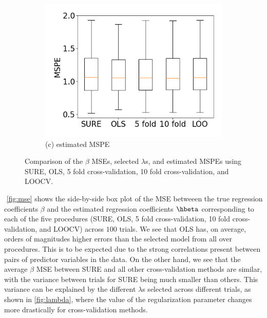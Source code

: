 \begin{figure}[t!]
\begin{subfigure}[b]{.32\columnwidth}
    \includegraphics[width=\columnwidth]{../fig/collinear_mspe.png}
    \caption{(c) estimated MSPE}
    \label{fig:mspe}
\end{subfigure}
\caption{Comparison of the $\beta$ MSEs, selected $\lambda$s, and estimated MSPEs using SURE, OLS, 5 fold cross-validation, 10 fold cross-validation, and LOOCV.}
\end{figure}

$ $\newline
\cref{fig:mse} shows the side-by-side box plot of the MSE betweeen the true regression coefficients $\beta$ and the estimated regression coefficients $\hbeta$ corresponding to each of the five procedures (SURE, OLS, 5 fold cross-validation, 10 fold cross-validation, and LOOCV) across $100$ trials. We see that OLS has, on average, orders of magnitudes higher errors than the selected model from all over procedures. This is to be expected due to the strong correlations present between pairs of predictor variables in the data. On the other hand, we see that the average $\beta$ MSE between SURE and all other cross-validation methods are similar, with the variance between trials for SURE being much smaller than others. This variance can be explained by the different $\lambda$s selected across different trials, as shown in \cref{fig:lambda}, where the value of the regularization parameter changes more drastically for cross-validation methods.

